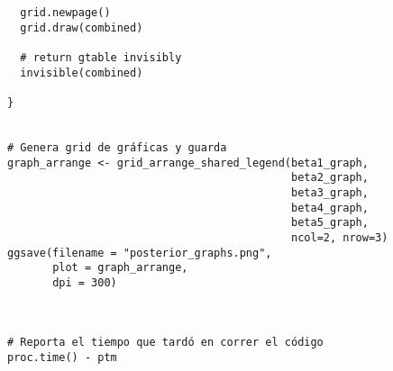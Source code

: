 \begin{lstlisting}
  grid.newpage()
  grid.draw(combined)
  
  # return gtable invisibly
  invisible(combined)
  
}


# Genera grid de gráficas y guarda
graph_arrange <- grid_arrange_shared_legend(beta1_graph,
                                            beta2_graph, 
                                            beta3_graph, 
                                            beta4_graph, 
                                            beta5_graph,
                                            ncol=2, nrow=3)
ggsave(filename = "posterior_graphs.png",
       plot = graph_arrange,
       dpi = 300)



# Reporta el tiempo que tardó en correr el código
proc.time() - ptm
\end{lstlisting}





